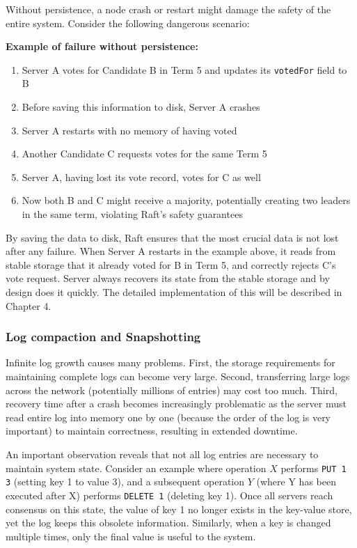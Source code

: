 \documentclass[shortabstract]{iithesis}
\begin{document}
Without persistence, a node crash or restart might damage the safety of the entire system. Consider the following dangerous scenario:

\textbf{Example of failure without persistence:}
\begin{enumerate}
    \item Server A votes for Candidate B in Term 5 and updates its \texttt{votedFor} field to B
    \item Before saving this information to disk, Server A crashes
    \item Server A restarts with no memory of having voted
    \item Another Candidate C requests votes for the same Term 5
    \item Server A, having lost its vote record, votes for C as well
    \item Now both B and C might receive a majority, potentially creating two leaders in the same term, violating Raft's safety guarantees
\end{enumerate}

By saving the data to disk, Raft ensures that the most crucial data is not lost after any failure. When Server A restarts in the example above, it reads from stable storage that it already voted for B in Term 5, and correctly rejects C's vote request. Server always recovers its state from the stable storage and by design does it quickly. The detailed implementation of this will be described in Chapter 4.


\subsubsection{Log compaction and Snapshotting}
\label{subsec:snapshotting_theory}

Infinite log growth causes many problems. First, the storage requirements for maintaining complete logs can become very large. Second, transferring large logs across the network (potentially millions of entries) may cost too much. Third, recovery time after a crash becomes increasingly problematic as the server must read entire log into memory one by one (because the order of the log is very important) to maintain correctness, resulting in extended downtime. 

An important observation reveals that not all log entries are necessary to maintain system state. Consider an example where operation $X$ performs \texttt{PUT 1 3} (setting key 1 to value 3), and a subsequent operation $Y$ (where Y has been executed after X) performs \texttt{DELETE 1} (deleting key 1). Once all servers reach consensus on this state, the value of key 1 no longer exists in the key-value store, yet the log keeps this obsolete information. Similarly, when a key is changed multiple times, only the final value is useful to the system.
\end{document}
